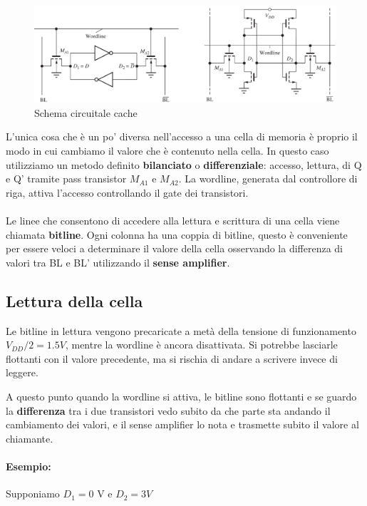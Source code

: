 \begin{figure}[htbp]
    \centering
    \includegraphics[width=0.7\linewidth]{img/cache.png}
    \caption{Schema circuitale cache}
\end{figure}

L'unica cosa che è un po' diversa nell'accesso a una cella di memoria è proprio il modo in cui cambiamo il valore che è contenuto nella cella. In questo caso utilizziamo un metodo definito \textbf{bilanciato} o \textbf{differenziale}: accesso, lettura, di Q e Q' tramite pass transistor $M_{A1}$ e $M_{A2}$. La wordline, generata dal controllore di riga, attiva l'accesso controllando il gate dei transistori.

\paragraph{}
Le linee che consentono di accedere alla lettura e scrittura di una cella viene chiamata \textbf{bitline}. Ogni colonna ha una coppia di bitline, questo è conveniente per essere veloci a determinare il valore della cella osservando la differenza di valori tra BL e BL' utilizzando il \textbf{sense amplifier}.


\subsection{Lettura della cella}
Le bitline in lettura vengono precaricate a metà della tensione di funzionamento $V_{DD}/2 = 1.5 V$, mentre la wordline è ancora
disattivata. Si potrebbe lasciarle flottanti con il valore precedente, ma si rischia di
andare a scrivere invece di leggere.

A questo punto quando la wordline si attiva, le bitline sono flottanti e se guardo la \textbf{differenza} tra i due transistori vedo subito da che parte sta andando il cambiamento dei valori, e il sense amplifier lo nota e trasmette subito il valore al chiamante.

\paragraph{Esempio: } Supponiamo $D_1 = 0$ V e $D_2 = 3 V$


